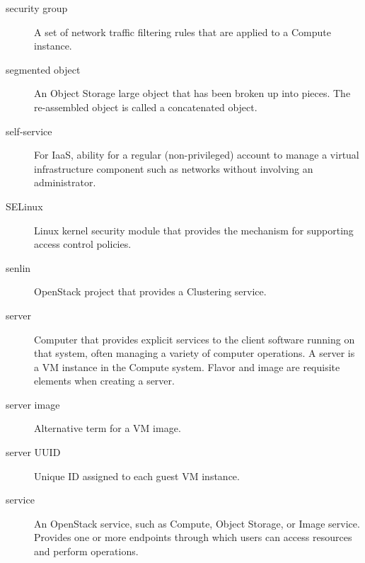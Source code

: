 \documentclass[letterpaper,10pt,english]{sphinxmanual}
\begin{document}
\begin{description}
\item[{security group}] \leavevmode{}\label{_source/glossary:term-security-group}
A set of network traffic filtering rules that are applied to a
Compute instance.

\item[{segmented object}] \leavevmode{}\label{_source/glossary:term-segmented-object}
An Object Storage large object that has been broken up into
pieces. The re-assembled object is called a concatenated
object.

\item[{self-service}] \leavevmode{}\label{_source/glossary:term-self-service}
For IaaS, ability for a regular (non-privileged) account to
manage a virtual infrastructure component such as networks without
involving an administrator.

\item[{SELinux}] \leavevmode{}\label{_source/glossary:term-selinux}
Linux kernel security module that provides the mechanism for
supporting access control policies.

\item[{senlin}] \leavevmode{}\label{_source/glossary:term-senlin}
OpenStack project that provides a Clustering service.

\item[{server}] \leavevmode{}\label{_source/glossary:term-server}
Computer that provides explicit services to the client software
running on that system, often managing a variety of computer
operations.
A server is a VM instance in the Compute system. Flavor and
image are requisite elements when creating a server.

\item[{server image}] \leavevmode{}\label{_source/glossary:term-server-image}
Alternative term for a VM image.

\item[{server UUID}] \leavevmode{}\label{_source/glossary:term-server-uuid}
Unique ID assigned to each guest VM instance.

\item[{service}] \leavevmode{}\label{_source/glossary:term-service}
An OpenStack service, such as Compute, Object Storage, or Image
service. Provides one or more endpoints through which users can access
resources and perform operations.


\end{description}
\end{document}
